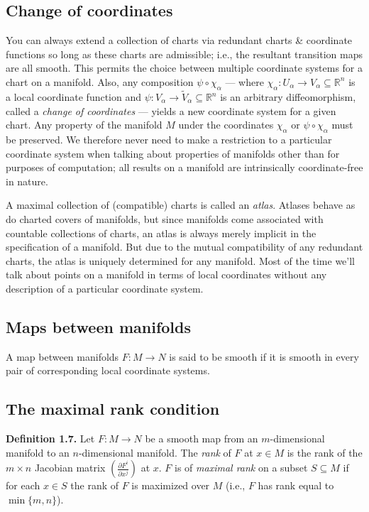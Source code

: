 \documentclass[a4paper]{article}
\newcommand{\R}{\mathbb{R}}
\begin{document}
\subsection{Change of coordinates}

You can always extend a collection of charts via redundant charts \& coordinate functions so long as these charts are admissible; i.e., the resultant transition maps are all smooth. This permits the choice between multiple coordinate systems for a chart on a manifold. Also, any composition $\psi \circ \chi_\alpha$ --- where $\chi_\alpha : U_\alpha \to V_\alpha \subseteq \R^n$ is a local coordinate function and $\psi : V_\alpha \to \tilde{V}_\alpha \subseteq \R^n$ is an arbitrary diffeomorphism, called a \emph{change of coordinates} --- yields a new coordinate system for a given chart. Any property of the manifold $M$ under the coordinates $\chi_\alpha$ or $\psi \circ \chi_\alpha$ must be preserved. We therefore never need to make a restriction to a particular coordinate system when talking about properties of manifolds other than for purposes of computation; all results on a manifold are intrinsically coordinate-free in nature.

A maximal collection of (compatible) charts is called an \emph{atlas}. Atlases behave as do charted covers of manifolds, but since manifolds come associated with countable collections of charts, an atlas is always merely implicit in the specification of a manifold. But due to the mutual compatibility of any redundant charts, the atlas is uniquely determined for any manifold. Most of the time we'll talk about points on a manifold in terms of local coordinates without any description of a particular coordinate system.

\subsection{Maps between manifolds}

A map between manifolds $F : M \to N$ is said to be smooth if it is smooth in every pair of corresponding local coordinate systems. 

\subsection{The maximal rank condition}

\textbf{Definition 1.7.} Let $F : M \to N$ be a smooth map from an $m$-dimensional manifold to an $n$-dimensional manifold. The \emph{rank} of $F$ at $x \in M$ is the rank of the $m \times n$ Jacobian matrix $\left(\frac{\partial F^i}{\partial x^j}\right)$ at $x$. $F$ is of \emph{maximal rank} on a subset $S \subseteq M$ if for each $x \in S$ the rank of $F$ is maximized over $M$ (i.e., $F$ has rank equal to $\min\{m, n\}$).
\end{document}
